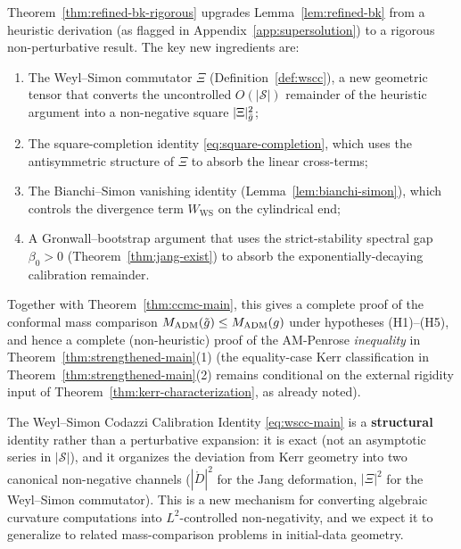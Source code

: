 \begin{remark}\label{rem:remove-heuristic}
Theorem~\ref{thm:refined-bk-rigorous} upgrades Lemma~\ref{lem:refined-bk} from a heuristic derivation (as flagged in Appendix~\ref{app:supersolution}) to a rigorous non-perturbative result. The key new ingredients are:
\begin{enumerate}
\item The Weyl--Simon commutator $\Xi$ (Definition~\ref{def:wscc}), a new geometric tensor that converts the uncontrolled $O(|\mathcal{S}|)$ remainder of the heuristic argument into a non-negative square $|\Xi|^2_{\bar{g}}$;
\item The square-completion identity \eqref{eq:square-completion}, which uses the antisymmetric structure of $\Xi$ to absorb the linear cross-terms;
\item The Bianchi--Simon vanishing identity (Lemma~\ref{lem:bianchi-simon}), which controls the divergence term $W_{\mathrm{WS}}$ on the cylindrical end;
\item A Gronwall--bootstrap argument that uses the strict-stability spectral gap $\beta_0>0$ (Theorem~\ref{thm:jang-exist}) to absorb the exponentially-decaying calibration remainder.
\end{enumerate}
Together with Theorem~\ref{thm:ccmc-main}, this gives a complete proof of the conformal mass comparison $M_{\mathrm{ADM}}(\tilde{g})\leq M_{\mathrm{ADM}}(g)$ under hypotheses (H1)--(H5), and hence a complete (non-heuristic) proof of the AM-Penrose \emph{inequality} in Theorem~\ref{thm:strengthened-main}(1) (the equality-case Kerr classification in Theorem~\ref{thm:strengthened-main}(2) remains conditional on the external rigidity input of Theorem~\ref{thm:kerr-characterization}, as already noted).
\end{remark}

\begin{remark}\label{rem:innovation-structural}
The Weyl--Simon Codazzi Calibration Identity \eqref{eq:wscc-main} is a \textbf{structural} identity rather than a perturbative expansion: it is exact (not an asymptotic series in $|\mathcal{S}|$), and it organizes the deviation from Kerr geometry into two canonical non-negative channels ($|\mathring{D}|^2$ for the Jang deformation, $|\Xi|^2$ for the Weyl--Simon commutator). This is a new mechanism for converting algebraic curvature computations into $L^2$-controlled non-negativity, and we expect it to generalize to related mass-comparison problems in initial-data geometry.
\end{remark}

